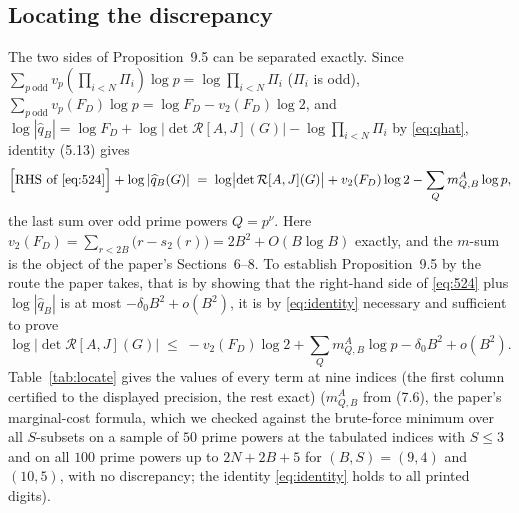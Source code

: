 \documentclass[11pt]{amsart}
\theoremstyle{definition}
\newcommand{\qhat}{\widehat{q}}
\begin{document}
\subsection{Locating the discrepancy}\label{sec:locate}
The two sides of Proposition~9.5 can be separated exactly. Since $\sum_{p\ \mathrm{odd}}v_p(\prod_{i<N}\Pi_i)\log p=\log\prod_{i<N}\Pi_i$
($\Pi_i$ is odd), $\sum_{p\ \mathrm{odd}}v_p(F_D)\log p=\log F_D-v_2(F_D)\log2$, and
$\log|\qhat_B|=\log F_D+\log|\det\mathcal R[A,J](G)|-\log\prod_{i<N}\Pi_i$ by \eqref{eq:qhat}, identity (5.13) gives
\begin{equation}\label{eq:identity}
\Bigl[\text{RHS of }\eqref{eq:524}\Bigr]+\log|\qhat_B(G)|\;=\;\log\bigl|\det\mathcal R[A,J](G)\bigr|+v_2(F_D)\log2-\sum_{Q}m^A_{Q,B}\log p ,
\end{equation}
the last sum over odd prime powers $Q=p^\nu$. Here $v_2(F_D)=\sum_{r<2B}\bigl(r-s_2(r)\bigr)=2B^2+O(B\log B)$
exactly, and the $m$-sum is the object of the paper's Sections~6--8. To establish Proposition~9.5 by the route the paper takes, that is by showing that the right-hand side of \eqref{eq:524} plus $\log|\qhat_B|$ is at most $-\delta_0B^2+o(B^2)$, it is by \eqref{eq:identity} necessary and sufficient to prove
\begin{equation}\label{eq:implied}
\log\bigl|\det\mathcal R[A,J](G)\bigr|\;\le\;-v_2(F_D)\log2+\sum_Qm^A_{Q,B}\log p-\delta_0B^2+o(B^2).
\end{equation}
Table~\ref{tab:locate} gives the values of every term at nine indices (the first column certified to the displayed precision, the rest exact) ($m^A_{Q,B}$ from (7.6), the paper's
marginal-cost formula, which we checked against the brute-force minimum over all $S$-subsets on a sample of $50$ prime powers at the tabulated indices with $S\le3$ and on all $100$ prime powers up to $2N+2B+5$ for $(B,S)=(9,4)$ and $(10,5)$, with no discrepancy; the identity
\eqref{eq:identity} holds to all printed digits).
\end{document}
